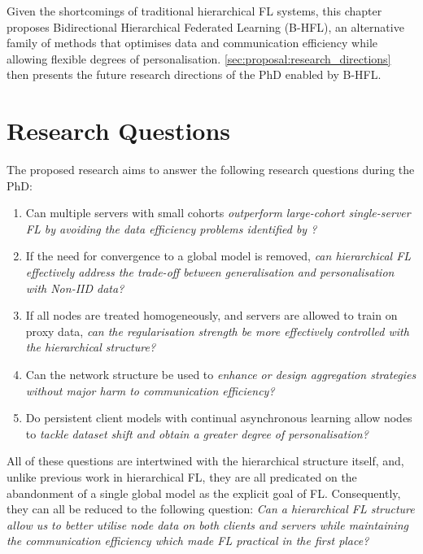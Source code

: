 
Given the shortcomings of traditional hierarchical FL systems, this chapter proposes Bidirectional Hierarchical Federated Learning (B-HFL), an alternative family of methods that optimises data and communication efficiency while allowing flexible degrees of personalisation. \cref{sec:proposal:research_directions} then presents the future research directions of the PhD enabled by B-HFL\@.

\section{Research Questions}\label{sec:proposal:research_questions}
The proposed research aims to answer the following research questions during the PhD\@:
\begin{singlespace*}
    \begin{enumerate}
        \item Can multiple servers with small cohorts \emph{outperform large-cohort single-server FL by avoiding the data efficiency problems identified by \citet{LargeCohorts}?}
        \item If the need for convergence to a global model is removed, \emph{can hierarchical FL effectively address the trade-off between generalisation and personalisation with Non-IID data?}
        \item If all nodes are treated homogeneously, and servers are allowed to train on proxy data, \emph{can the regularisation strength be more effectively controlled with the hierarchical structure?}
        \item Can the network structure be used to \emph{enhance or design aggregation strategies without major harm to communication efficiency?}
        \item Do persistent client models with continual asynchronous learning allow nodes to \emph{tackle dataset shift and obtain a greater degree of personalisation?}
    \end{enumerate}
\end{singlespace*}
All of these questions are intertwined with the hierarchical structure itself, and, unlike previous work in hierarchical FL, they are all predicated on the abandonment of a single global model as the explicit goal of FL\@. Consequently, they can all be reduced to the following question: \emph{Can a hierarchical FL structure allow us to better utilise node data on both clients and servers while maintaining the communication efficiency which made FL practical in the first place?}

